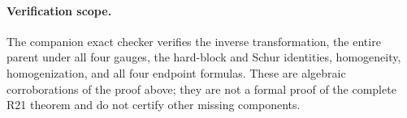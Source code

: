 \paragraph{Verification scope.}
The companion exact checker verifies the inverse transformation, the
entire parent under all four gauges, the hard-block and Schur identities,
homogeneity, homogenization, and all four endpoint formulas.  These are
algebraic corroborations of the proof above; they are not a formal proof
of the complete R21 theorem and do not certify other missing components.
